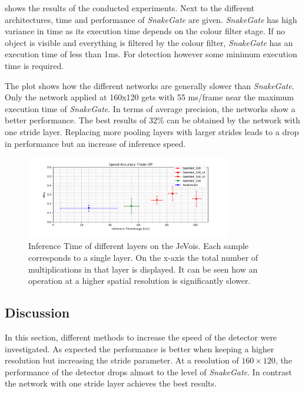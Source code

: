  shows the results of the conducted experiments. Next to the different architectures, time and performance of \textit{SnakeGate} are given. \textit{SnakeGate} has high variance in time as its execution time depends on the colour filter stage. If no object is visible and everything is filtered by the colour filter, \textit{SnakeGate} has an execution time of less than 1ms. For detection however some minimum execution time is required.

The plot shows how the different networks are generally slower than \textit{SnakeGate}. Only the network applied at 160x120 gets with 55 ms/frame near the maximum execution time of \textit{SnakeGate}. In terms of average precision, the networks show a better performance. The best results of 32\% can be obtained by the network with one stride layer. Replacing more pooling layers with larger strides leads to a drop in performance but an increase of inference speed.

\begin{figure}[hbtp]
	\centering
	\includegraphics[width=0.8\textwidth]{fig/ap_speed_tradeoff}
	\caption{Inference Time of different layers on the JeVois. Each sample corresponds to a single layer. On the x-axis the total number of multiplications in that layer is displayed. It can be seen how an operation at a higher spatial resolution is significantly slower.}
	\label{fig:ap_speed_tradeoff}
\end{figure}


\subsection{Discussion}

In this section, different methods to increase the speed of the detector were investigated. As expected the performance is better when keeping a higher resolution but increasing the stride parameter. At a resolution of $160\times120$, the performance of the detector drops almost to the level of \textit{SnakeGate}. In contrast the network with one stride layer achieves the best results.

